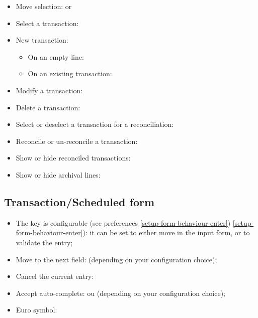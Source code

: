 \begin{itemize}
	\item Move selection: \keys{\arrowkeyup} or \keys{\arrowkeydown}%
	\item Select a transaction: %
	\item New transaction:%
	\begin{itemize}
		\item On an empty line: %
		\item On an existing transaction: %
	\end{itemize}
	\item Modify a transaction: %
	\item Delete a transaction: %
	\item Select or deselect a transaction for a reconciliation: %
	\item Reconcile or un-reconcile a transaction: %
	\item Show or hide reconciled transactions: %
	\item Show or hide archival lines: %
\end{itemize}


\subsection{Transaction/Scheduled form}

\begin{itemize}
	\item The  key is configurable (see preferences \vref{setup-form-behaviour-enter}) \vref{setup-form-behaviour-enter}): it can be set to either move in the input form, or to validate the entry;
	\item Move to the next field:  (depending on your configuration choice);
	\item Cancel the current entry: \keys{\esc}%
	\item Accept auto-complete:  ou  (depending on your configuration choice);
	\item Euro symbol: %
\end{itemize}


